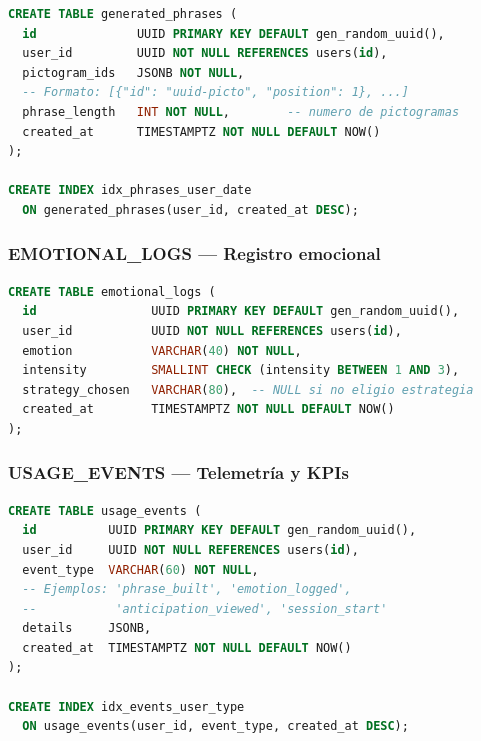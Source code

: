 \documentclass[12pt, a4paper]{article}
\begin{document}
\begin{cajatecnica}
\begin{lstlisting}[language=SQL]
CREATE TABLE generated_phrases (
  id              UUID PRIMARY KEY DEFAULT gen_random_uuid(),
  user_id         UUID NOT NULL REFERENCES users(id),
  pictogram_ids   JSONB NOT NULL,
  -- Formato: [{"id": "uuid-picto", "position": 1}, ...]
  phrase_length   INT NOT NULL,        -- numero de pictogramas
  created_at      TIMESTAMPTZ NOT NULL DEFAULT NOW()
);

CREATE INDEX idx_phrases_user_date
  ON generated_phrases(user_id, created_at DESC);
\end{lstlisting}
\end{cajatecnica}

\subsubsection{EMOTIONAL\_LOGS --- Registro emocional}

\begin{cajatecnica}
\begin{lstlisting}[language=SQL]
CREATE TABLE emotional_logs (
  id                UUID PRIMARY KEY DEFAULT gen_random_uuid(),
  user_id           UUID NOT NULL REFERENCES users(id),
  emotion           VARCHAR(40) NOT NULL,
  intensity         SMALLINT CHECK (intensity BETWEEN 1 AND 3),
  strategy_chosen   VARCHAR(80),  -- NULL si no eligio estrategia
  created_at        TIMESTAMPTZ NOT NULL DEFAULT NOW()
);
\end{lstlisting}
\end{cajatecnica}

\subsubsection{USAGE\_EVENTS --- Telemetría y KPIs}

\begin{cajatecnica}
\begin{lstlisting}[language=SQL]
CREATE TABLE usage_events (
  id          UUID PRIMARY KEY DEFAULT gen_random_uuid(),
  user_id     UUID NOT NULL REFERENCES users(id),
  event_type  VARCHAR(60) NOT NULL,
  -- Ejemplos: 'phrase_built', 'emotion_logged',
  --           'anticipation_viewed', 'session_start'
  details     JSONB,
  created_at  TIMESTAMPTZ NOT NULL DEFAULT NOW()
);

CREATE INDEX idx_events_user_type
  ON usage_events(user_id, event_type, created_at DESC);
\end{lstlisting}
\end{cajatecnica}
\end{document}
